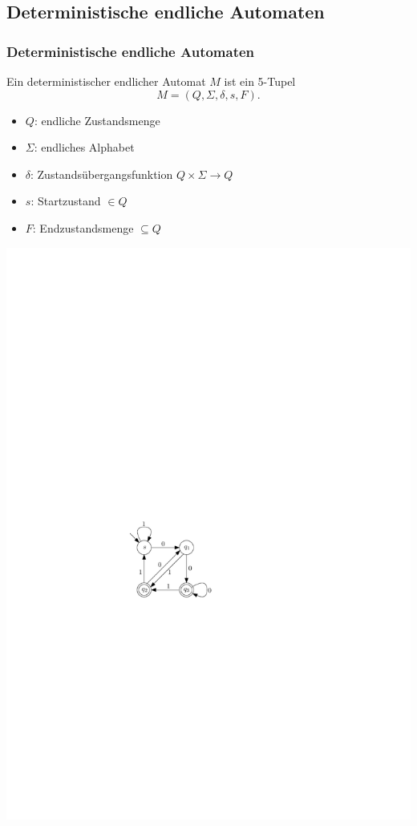 \subsection{Deterministische endliche Automaten}
\begin{frame}
\frametitle{Deterministische endliche Automaten}

	\begin{minipage}{0.5 \textwidth}
	 \raggedright{ Ein deterministischer endlicher Automat $M$ ist ein 5-Tupel 
        \[
        M= (Q,\Sigma,\delta,s,F).
        \] }
        \begin{itemize}
        \item $Q$:  endliche Zustandsmenge
        \item $\Sigma$:    endliches Alphabet
        \item $\delta$:   Zustandsübergangsfunktion $Q\times \Sigma \rightarrow Q$
        \item $s$:   Startzustand $\in Q$
        \item $F$:   Endzustandsmenge $\subseteq Q$
        \end{itemize}
	\end{minipage}
	\hfill
    \begin{minipage}{0.45 \textwidth}        
        \begin{center}
        	\includegraphics[scale=1]{images/beispielDEA1.pdf}
        \end{center}
    \end{minipage}
\end{frame}
